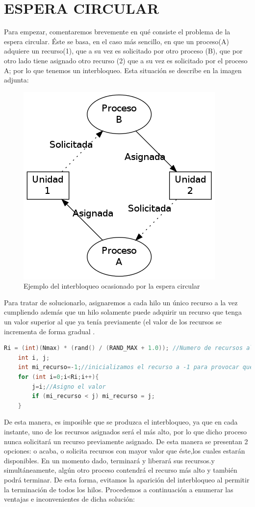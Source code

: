 \documentclass[10 pt,spanish]{article}  %
\begin{document}
\section{ESPERA CIRCULAR}

Para empezar, comentaremos brevemente en qué consiste el problema de la espera circular. Éste se basa, en el caso más sencillo, en que un proceso(A) adquiere un recurso(1), que a su vez es solicitado por otro proceso (B), que por otro lado tiene asignado otro recurso (2) que a su vez es solicitado por el proceso A; por lo que tenemos un interbloqueo. Esta situación se describe en la imagen adjunta:
\begin{figure}[H]
  \centering
  \includegraphics[scale=0.4]{bloqueo_mutuo_simple.png}
  \caption{Ejemplo del interbloqueo ocasionado por la espera circular}
  \label{fig:grafico1}
\end{figure}
Para tratar de solucionarlo, asignaremos a cada hilo un único recurso a la vez cumpliendo además que un hilo solamente puede adquirir un recurso que tenga un valor superior al que ya tenía previamente (el valor de los recursos se incrementa de forma gradual .
\begin{lstlisting}[language=C++,caption=Asignación de un recurso a un hilo en caso de sea mayor que el que ya tenía.]
     Ri = (int)(Nmax) * (rand() / (RAND_MAX + 1.0)); //Numero de recursos aleatorios <=N, siendo Nmax el numero de recursos
    int i, j;
    int mi_recurso=-1;//inicializamos el recurso a -1 para provocar que se pueda asignar el primer recurso (0) al primer hilo que entra en la funcion trabajo
    for (int i=0;i<Ri;i++){
        j=i;//Asigno el valor 
        if (mi_recurso < j) mi_recurso = j; 
  	}
\end{lstlisting}
De esta manera, es imposible que se produzca el interbloqueo, ya que en cada instante, uno de los recursos asignados será el más alto, por lo que dicho proceso nunca solicitará un recurso previamente asignado. De esta manera se presentan 2 opciones: o acaba, o solicita recursos con mayor valor que éste,los cuales estarán disponibles. En un momento dado, terminará y liberará sus recursos.y simultáneamente, algún otro proceso contendrá el recurso más alto y también podrá terminar. De esta forma, evitamos la aparición del interbloqueo al permitir la terminación de todos los hilos.
Procedemos a continuación a enumerar las ventajas e inconvenientes de dicha solución:
\end{document}
